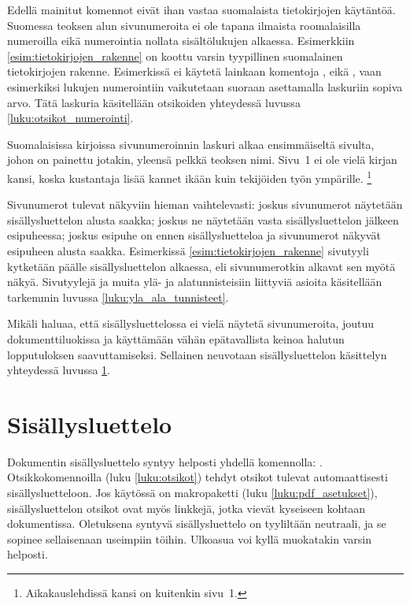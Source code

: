Edellä mainitut komennot eivät ihan vastaa suomalaista tietokirjojen
käytäntöä. Suomessa teoksen alun sivunumeroita ei ole tapana ilmaista
roomalaisilla numeroilla eikä numerointia nollata sisältölukujen
alkaessa. Esimerkkiin \ref{esim:tietokirjojen_rakenne} on koottu varsin
tyypillinen suomalainen tietokirjojen rakenne. Esimerkissä ei käytetä
lainkaan komentoja ,  eikä
, vaan esimerkiksi lukujen numerointiin vaikutetaan
suoraan asettamalla laskuriin  sopiva arvo. Tätä
laskuria käsitellään otsikoiden yhteydessä luvussa
\ref{luku:otsikot_numerointi}.

Suomalaisissa kirjoissa sivunumeroinnin laskuri alkaa ensimmäiseltä
sivulta, johon on painettu jotakin, yleensä pelkkä teoksen nimi. Sivu~1
ei ole vielä kirjan kansi, koska kustantaja lisää kannet ikään kuin
tekijöiden työn ympärille.%
\footnote{Aikakauslehdissä kansi on kuitenkin sivu~1.}

Sivunumerot tulevat näkyviin hieman vaihtelevasti: joskus sivunumerot
näytetään sisällysluettelon alusta saakka; joskus ne näytetään vasta
sisällysluettelon jälkeen esipuheessa; joskus esipuhe on ennen
sisällysluetteloa ja sivunumerot näkyvät esipuheen alusta saakka.
Esimerkissä \ref{esim:tietokirjojen_rakenne} sivutyyli 
kytketään päälle sisällysluettelon alkaessa, eli sivunumerotkin alkavat
sen myötä näkyä. Sivutyylejä ja muita ylä- ja alatunnisteisiin liittyviä
asioita käsitellään tarkemmin luvussa \ref{luku:yla_ala_tunnisteet}.

Mikäli haluaa, että sisällysluettelossa ei vielä näytetä sivunumeroita,
joutuu dokumenttiluokissa  ja  käyttämään
vähän epätavallista keinoa halutun lopputuloksen saavuttamiseksi.
Sellainen neuvotaan sisällysluettelon käsittelyn yhteydessä luvussa
\ref{luku:sisallysluettelo}.

\section{Sisällysluettelo}
\label{luku:sisallysluettelo}

Dokumentin sisällysluettelo syntyy helposti yhdellä komennolla:
. Otsikkokomennoilla (luku \ref{luku:otsikot})
tehdyt otsikot tulevat automaattisesti sisällysluetteloon. Jos käytössä
on makropaketti  (luku \ref{luku:pdf_asetukset}),
sisällysluettelon otsikot ovat myös linkkejä, jotka vievät kyseiseen
kohtaan dokumentissa. Oletuksena syntyvä sisällysluettelo on tyyliltään
neutraali, ja se sopinee sellaisenaan useimpiin töihin. Ulkoasua voi
kyllä muokatakin varsin helposti.

